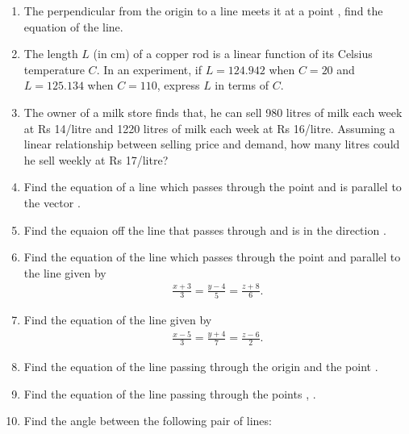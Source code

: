 \begin{enumerate}[label=\arabic*.,ref=\thesubsection.\theenumi]
\item The perpendicular from the origin to a line meets it at a point , find the equation of the line.
\item The length $L$ (in cm) of a copper rod is a linear function of its Celsius temperature $C$.  In an experiment, if $L=124.942$  when $C=20$ and $L=125.134$ when $C = 110$, express $L$ in terms of $C$.
%
\item The owner of a milk store finds that, he can sell 980 litres of milk each week at Rs 14/litre and 1220 litres of milk each week at Rs 16/litre. Assuming a linear relationship between selling price and demand, how many litres could he sell weekly at Rs 17/litre?

\item Find the equation of a line which passes through the point  and is parallel to the vector .
\item Find the equaion off the line that passes through  and is in the direction .
\item Find the equation of the line which passes through  the point  and parallel to the line given by 
\begin{align}
\frac{x+3}{3} = \frac{y-4}{5} = \frac{z+8}{6}. 
\end{align}
\item Find the equation of the line given by 
\begin{align}
\frac{x-5}{3} = \frac{y+4}{7} = \frac{z-6}{2}. 
\end{align}
\item Find the equation of the line passing through the origin and the point .
\item Find the equation of the line passing through the points , .
\item Find the angle between the following pair of lines:

\end{enumerate}
